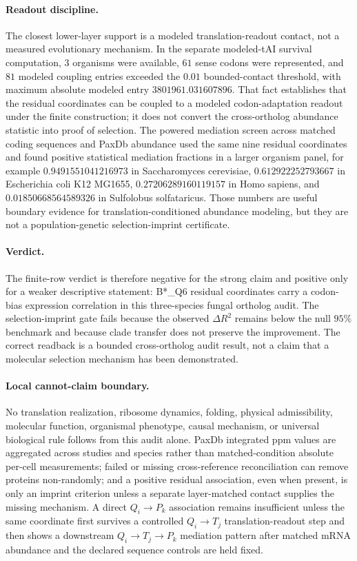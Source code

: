 \paragraph{Readout discipline.}
The closest lower-layer support is a modeled translation-readout contact, not a measured evolutionary mechanism.  In the separate modeled-tAI survival computation, $3$ organisms were available, $61$ sense codons were represented, and $81$ modeled coupling entries exceeded the $0.01$ bounded-contact threshold, with maximum absolute modeled entry $3801961.031607896$.  That fact establishes that the residual coordinates can be coupled to a modeled codon-adaptation readout under the finite construction; it does not convert the cross-ortholog abundance statistic into proof of selection.  The powered mediation screen across matched coding sequences and PaxDb abundance used the same nine residual coordinates and found positive statistical mediation fractions in a larger organism panel, for example $0.9491551041216973$ in Saccharomyces cerevisiae, $0.612922252793667$ in Escherichia coli K12 MG1655, $0.27206289160119157$ in Homo sapiens, and $0.01850668564589326$ in Sulfolobus solfataricus.  Those numbers are useful boundary evidence for translation-conditioned abundance modeling, but they are not a population-genetic selection-imprint certificate.

\paragraph{Verdict.}
The finite-row verdict is therefore negative for the strong claim and positive only for a weaker descriptive statement: B*\_Q6 residual coordinates carry a codon-bias expression correlation in this three-species fungal ortholog audit.  The selection-imprint gate fails because the observed $\Delta R^2$ remains below the null $95\%$ benchmark and because clade transfer does not preserve the improvement.  The correct readback is a bounded cross-ortholog audit result, not a claim that a molecular selection mechanism has been demonstrated.

\paragraph{Local cannot-claim boundary.}
No translation realization, ribosome dynamics, folding, physical admissibility, molecular function, organismal phenotype, causal mechanism, or universal biological rule follows from this audit alone.  PaxDb integrated ppm values are aggregated across studies and species rather than matched-condition absolute per-cell measurements; failed or missing cross-reference reconciliation can remove proteins non-randomly; and a positive residual association, even when present, is only an imprint criterion unless a separate layer-matched contact supplies the missing mechanism.  A direct $Q_i \to P_k$ association remains insufficient unless the same coordinate first survives a controlled $Q_i \to T_j$ translation-readout step and then shows a downstream $Q_i \to T_j \to P_k$ mediation pattern after matched mRNA abundance and the declared sequence controls are held fixed.